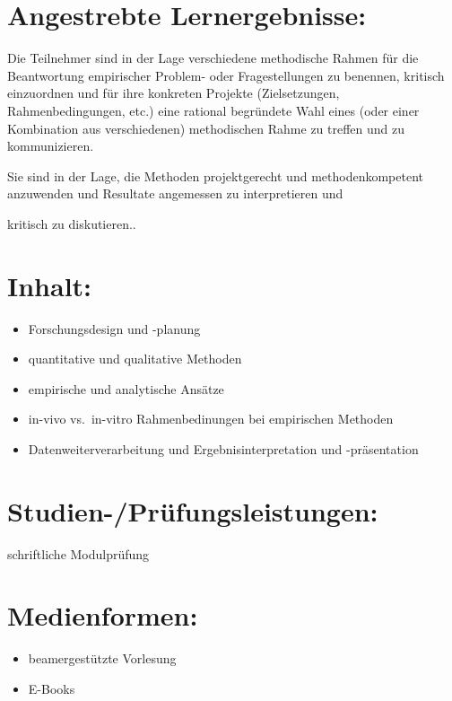 \section*{Angestrebte
Lernergebnisse:}\label{angestrebte-lernergebnisse-3}

Die Teilnehmer sind in der Lage verschiedene methodische Rahmen für die
Beantwortung empirischer Problem- oder Fragestellungen zu benennen,
kritisch einzuordnen und für ihre konkreten Projekte (Zielsetzungen,
Rahmenbedingungen, etc.) eine rational begründete Wahl eines (oder einer
Kombination aus verschiedenen) methodischen Rahme zu treffen und zu
kommunizieren.

Sie sind in der Lage, die Methoden projektgerecht und methodenkompetent
anzuwenden und Resultate angemessen zu interpretieren und

kritisch zu diskutieren..

\section*{Inhalt:}\label{inhalt-3}

\begin{itemize}
\item
  Forschungsdesign und -planung
\item
  quantitative und qualitative Methoden
\item
  empirische und analytische Ansätze
\item
  in-vivo vs.~in-vitro Rahmenbedinungen bei empirischen Methoden
\item
  Datenweiterverarbeitung und Ergebnisinterpretation und -präsentation
\end{itemize}

\section*{Studien-/Prüfungsleistungen:}\label{studien-pruxfcfungsleistungen-3}

schriftliche Modulprüfung

\section*{Medienformen:}\label{medienformen-3}

\begin{itemize}
\item
  beamergestützte Vorlesung
\item
  E-Books
\end{itemize}

